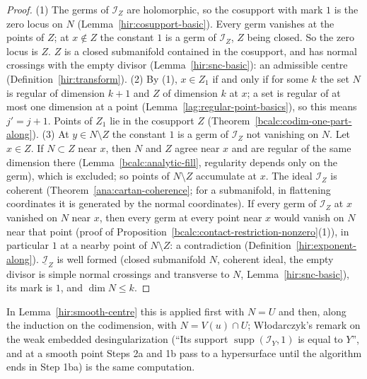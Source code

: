 \begin{proof}
\mixedleanok
(1) The germs of \(\mathcal I_Z\) are holomorphic, so the cosupport with mark \(1\) is the zero locus on \(N\) (Lemma~\ref{hir:cosupport-basic}). Every germ vanishes at the
points of \(Z\); at \(x\notin Z\) the constant \(1\) is a germ of \(\mathcal I_Z\), \(Z\) being closed. So the zero locus is \(Z\). \(Z\) is a closed submanifold contained in
the cosupport, and has normal crossings with the empty divisor (Lemma~\ref{hir:snc-basic}): an admissible centre (Definition~\ref{hir:transform}).
(2) By (1), \(x\in Z_1\) if and only if for some \(k\) the set \(N\) is regular of dimension \(k+1\) and \(Z\) of dimension \(k\) at \(x\); a set is regular of at most one
dimension at a point (Lemma~\ref{lag:regular-point-basics}), so this means \(j'=j+1\). Points of \(Z_1\) lie in the cosupport \(Z\) (Theorem~\ref{bcalc:codim-one-part-along}).
(3) At \(y\in N\setminus Z\) the constant \(1\) is a germ of \(\mathcal I_Z\) not vanishing on \(N\). Let \(x\in Z\). If \(N\subset Z\) near \(x\), then \(N\) and \(Z\) agree near \(x\)
and are regular of the same dimension there (Lemma~\ref{bcalc:analytic-fill}, regularity depends only on the germ), which is excluded; so points of \(N\setminus Z\)
accumulate at \(x\). The ideal \(\mathcal I_Z\) is coherent (Theorem~\ref{ana:cartan-coherence}; for a submanifold, in flattening coordinates it is generated by the
normal coordinates). If every germ of \(\mathcal I_Z\) at \(x\) vanished on \(N\) near \(x\), then every germ at every point near \(x\) would vanish on \(N\) near that point
(proof of Proposition~\ref{bcalc:contact-restriction-nonzero}(1)), in particular \(1\) at a nearby point of \(N\setminus Z\): a contradiction (Definition~\ref{hir:exponent-along}).
\(\underline{\mathcal I}_Z\) is well formed (closed submanifold \(N\), coherent ideal, the empty divisor is simple normal crossings and transverse to \(N\),
Lemma~\ref{hir:snc-basic}), its mark is \(1\), and \(\dim N\le k\).
\end{proof}
In Lemma~\ref{hir:smooth-centre} this is applied first with \(N=U\) and then, along the induction on the codimension, with \(N=V(u)\cap U\); Włodarczyk's remark
on the weak embedded desingularization (``Its support \(\operatorname{supp}(\mathcal I_Y,1)\) is equal to \(Y\)'', and at a smooth point Steps 2a and 1b pass to a
hypersurface until the algorithm ends in Step 1ba) is the same computation.


